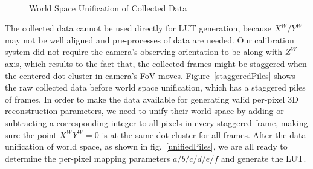 \\\indent
%
 \begin{figure}[t]
\hspace*{-0.5cm}
\centering
{}
{}
%
\caption{World Space Unification of Collected Data}
\label{worldSpaceDataUnification}
\end{figure}
%
The collected data cannot be used directly for LUT generation, because \(X^W/Y^W\) may not be well aligned and pre-processes of data are needed. Our calibration system did not require the camera's observing orientation to be along with \(Z^W\)-axis, which results to the fact that, the collected frames might be staggered when the centered dot-cluster in camera's FoV moves. Figure~\ref{staggeredPiles} shows the raw collected data before world space unification, which has a staggered piles of frames. In order to make the data available for generating valid per-pixel 3D reconstruction parameters, we need to unify their world space by adding or subtracting a corresponding integer to all pixels in every staggered frame, making sure the point \(X^WY^W = 0\) is at the same dot-cluster for all frames.	After the data unification of world space, as shown in fig.~\ref{unifiedPiles}, we are all ready to determine the per-pixel mapping parameters \(a/b/c/d/e/f\) and generate the LUT.
%
